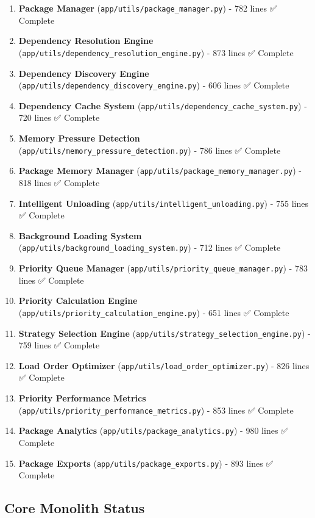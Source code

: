 \documentclass[11pt]{article}
\begin{document}
\begin{enumerate}
\item \textbf{Package Manager} (\texttt{app/utils/package\_manager.py}) - 782 lines ✅ Complete
\item \textbf{Dependency Resolution Engine} (\texttt{app/utils/dependency\_resolution\_engine.py}) - 873 lines ✅ Complete
\item \textbf{Dependency Discovery Engine} (\texttt{app/utils/dependency\_discovery\_engine.py}) - 606 lines ✅ Complete
\item \textbf{Dependency Cache System} (\texttt{app/utils/dependency\_cache\_system.py}) - 720 lines ✅ Complete
\item \textbf{Memory Pressure Detection} (\texttt{app/utils/memory\_pressure\_detection.py}) - 786 lines ✅ Complete
\item \textbf{Package Memory Manager} (\texttt{app/utils/package\_memory\_manager.py}) - 818 lines ✅ Complete
\item \textbf{Intelligent Unloading} (\texttt{app/utils/intelligent\_unloading.py}) - 755 lines ✅ Complete
\item \textbf{Background Loading System} (\texttt{app/utils/background\_loading\_system.py}) - 712 lines ✅ Complete
\item \textbf{Priority Queue Manager} (\texttt{app/utils/priority\_queue\_manager.py}) - 783 lines ✅ Complete
\item \textbf{Priority Calculation Engine} (\texttt{app/utils/priority\_calculation\_engine.py}) - 651 lines ✅ Complete
\item \textbf{Strategy Selection Engine} (\texttt{app/utils/strategy\_selection\_engine.py}) - 759 lines ✅ Complete
\item \textbf{Load Order Optimizer} (\texttt{app/utils/load\_order\_optimizer.py}) - 826 lines ✅ Complete
\item \textbf{Priority Performance Metrics} (\texttt{app/utils/priority\_performance\_metrics.py}) - 853 lines ✅ Complete
\item \textbf{Package Analytics} (\texttt{app/utils/package\_analytics.py}) - 980 lines ✅ Complete
\item \textbf{Package Exports} (\texttt{app/utils/package\_exports.py}) - 893 lines ✅ Complete
\end{enumerate}

\subsection{Core Monolith Status}
\end{document}
